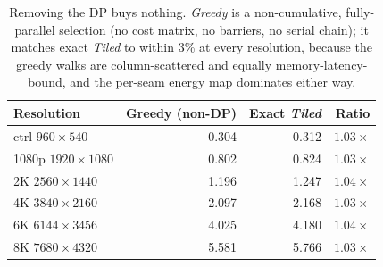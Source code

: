 \begin{table}[h!]
\caption{Removing the DP buys nothing. \emph{Greedy} is a non-cumulative,
fully-parallel selection (no cost matrix, no barriers, no serial chain); it
matches exact \emph{Tiled} to within 3\% at every resolution, because the greedy
walks are column-scattered and equally memory-latency-bound, and the per-seam
energy map dominates either way.}
\label{tab:greedy}
\centering
\begin{tabular}{@{}lrrr@{}}
\toprule
\textbf{Resolution} & \textbf{Greedy (non-DP)} & \textbf{Exact \emph{Tiled}} & \textbf{Ratio} \\
\midrule
ctrl  $960{\times}540$   & 0.304 & 0.312 & $1.03\times$ \\
1080p $1920{\times}1080$ & 0.802 & 0.824 & $1.03\times$ \\
2K    $2560{\times}1440$ & 1.196 & 1.247 & $1.04\times$ \\
4K    $3840{\times}2160$ & 2.097 & 2.168 & $1.03\times$ \\
6K    $6144{\times}3456$ & 4.025 & 4.180 & $1.04\times$ \\
8K    $7680{\times}4320$ & 5.581 & 5.766 & $1.03\times$ \\
\bottomrule
\end{tabular}
\end{table}
